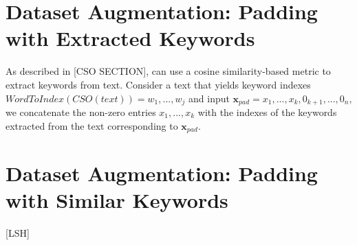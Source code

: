 \section{Dataset Augmentation: Padding with Extracted Keywords}
As described in [CSO SECTION], can use a cosine similarity-based metric to extract keywords from text.
Consider a text that yields keyword indexes $WordToIndex(CSO(text)) = {w_1,...,w_j}$ and input $\bm{x}_{pad} = x_1,...,x_k, 0_{k+1}, ..., 0_{n}$, we concatenate the non-zero entries $x_1,...,x_k$
with the indexes of the keywords extracted from the text corresponding to $\bm{x}_{pad}$.


\section{Dataset Augmentation: Padding with Similar Keywords}
[LSH]
